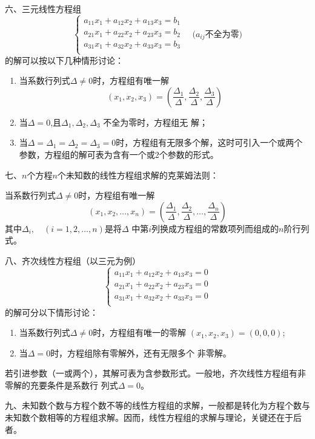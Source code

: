 六、三元线性方程组
\[\begin{cases}
    a_{11}x_1+a_{12}x_2+a_{13}x_3=b_1\\
    a_{21}x_1+a_{22}x_2+a_{23}x_3=b_2\\
    a_{31}x_1+a_{32}x_2+a_{33}x_3=b_3\\
\end{cases}\quad \text{($a_{ij}$不全为零)}\]
的解可以按以下几种情形讨论：
\begin{enumerate}
    \item 当系数行列式$\Delta \ne 0$时，方程组有唯一解
\[(x_1,x_2,x_3)=\left(\frac{\Delta_1}{\Delta},\frac{\Delta_2}{\Delta},\frac{\Delta_3}{\Delta}\right)\]
\item 当$\Delta =0$,且$\Delta_1 ,\Delta_2 ,\Delta_3$ 不全为零时，方程组无
解；
\item 当$\Delta =\Delta_1 =\Delta_2 =\Delta_3 =0$时，方程组有无限多个解，这时可引入一个或两个参数，方程组的解可表为含有一个或2个参数的形式。
\end{enumerate}

七、$n$个方程$n$个未知数的线性方程组求解的克莱姆法则：

当系数行列式$\Delta \ne 0$时，方程组有唯一解
\[(x_1,x_2,\ldots,x_n)=\left(\frac{\Delta_1}{\Delta},\frac{\Delta_2}{\Delta},\ldots,\frac{\Delta_n}{\Delta}\right)\]
其中$\Delta_i,\quad (i=1, 2,\ldots,n)$是将$\Delta$ 中第$i$列换成方程组的常数项列而组成的$n$阶行列式。

八、齐次线性方程组（以三元为例）
\[\begin{cases}
    a_{11}x_1+a_{12}x_2+a_{13}x_3=0\\
    a_{21}x_1+a_{22}x_2+a_{23}x_3=0\\
    a_{31}x_1+a_{32}x_2+a_{33}x_3=0\\
\end{cases}\]
的解可分以下情形讨论：
\begin{enumerate}
    \item 当系数行列式$\Delta \ne 0$时，方程组有唯一的零解
$(x_1, x_2, x_3) = (0, 0, 0)$;
\item 当$\Delta =0$时，方程组除有零解外，还有无限多个
非零解。
\end{enumerate}

若引进参数（一或两个），其解可表为含参数形式。一般地，齐次线性方程组有非零解的充要条件是系数行
列式$\Delta =0$。

九、未知数个数与方程个数不等的线性方程组的求解，一般都是转化为方程个数与未知数个数相等的方程组求解。因而，线性方程组的求解与理论，关键还在于后者。




